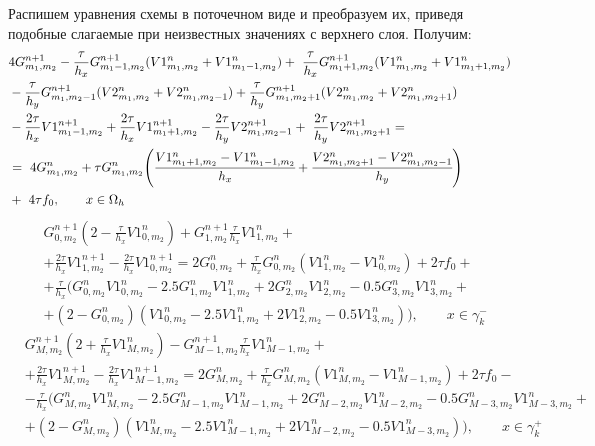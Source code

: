 \documentclass[a4paper,12pt]{extarticle}
\begin{document}
Распишем уравнения схемы в поточечном виде и преобразуем их, приведя подобные слагаемые при неизвестных значениях с верхнего слоя. Получим:
\begin{align*}
	& 4 G_{m_1,m_2}^{n+1}  -\frac{\tau}{h_x}  G_{m_1-1,m_2}^{n+1}(V1_{m_1,m_2}^n + V1_{m_1-1,m_2}^n) +\ \frac{\tau}{h_x} G_{m_1+1,m_2}^{n+1}(V1_{m_1,m_2}^n + V1_{m_1+1,m_2}^n)\\
	& -\frac{\tau}{h_y} G_{m_1,m_2-1}^{n+1}(V2_{m_1,m_2}^n + V2_{m_1,m_2-1}^n)
	+ \frac{\tau}{h_y} G_{m_1,m_2+1}^{n+1}(V2_{m_1,m_2}^n + V2_{m_1,m_2+1}^n)\\
	& -\frac{2\tau}{h_x} V1_{m_1-1,m_2}^{n+1} + \frac{2\tau}{h_x} V1_{m_1+1,m_2}^{n+1}
	-\frac{2\tau}{h_y} V2_{m_1,m_2-1}^{n+1} +\ \frac{2\tau}{h_y} V2_{m_1,m_2+1}^{n+1} = \\
	& =\ 4 G_{m_1,m_2}^n + \tau G_{m_1,m_2}^n 
	\Bigg(\cfrac{V1_{m_1+1,m_2}^n - V1_{m_1-1,m_2}^n}{h_x} +  \cfrac{V2_{m_1,m_2+1}^n - V2_{m_1,m_2-1}^n}{h_y}\Bigg) \\
	& +\ 4\tau f_0, \qquad x\in \Omega _h
\end{align*}
\begin{align*}
	& G_{0,m_2}^{n+1}(2 - \frac{\tau}{h_x}V1_{0,m_2}^n) + G_{1,m_2}^{n+1}\frac{\tau}{h_x}V1_{1,m_2}^n + \\
	& + \frac{2\tau}{h_x}V1_{1,m_2}^{n+1} - \frac{2\tau}{h_x}V1_{0,m_2}^{n+1} = 
	2 G_{0,m_2}^n + \frac{\tau}{h_x} G_{0,m_2}^n (V1_{1,m_2}^n - V1_{0,m_2}^n) + 2\tau f_0 +\\
	& + \frac{\tau}{h_x} \Big( G_{0,m_2}^n V1_{0,m_2}^n - 2.5 G_{1,m_2}^n V1_{1,m_2}^n 
	+ 2 G_{2,m_2}^n V1_{2,m_2}^n - 0.5 G_{3,m_2}^n V1_{3,m_2}^n + \\
	& + (2 - G_{0,m_2}^n)
	(V1_{0,m_2}^n - 2.5 V1_{1,m_2}^n + 2 V1_{2,m_2}^n - 0.5 V1_{3,m_2}^n) \Big), \qquad x \in \gamma_k^-
\end{align*}
\begin{align*}
	& G_{M,m_2}^{n+1}(2 + \frac{\tau}{h_x}V1_{M,m_2}^n) - G_{M-1,m_2}^{n+1}\frac{\tau}{h_x}V1_{M-1,m_2}^n + \\
	& + \frac{2\tau}{h_x}V1_{M,m_2}^{n+1} - \frac{2\tau}{h_x}V1_{M-1,m_2}^{n+1} = 
	2 G_{M,m_2}^n + \frac{\tau}{h_x} G_{M,m_2}^n (V1_{M,m_2}^n - V1_{M-1,m_2}^n) + 2\tau f_0 -\\
	& - \frac{\tau}{h_x} \Big( G_{M,m_2}^n V1_{M,m_2}^n - 2.5 G_{M-1,m_2}^n V1_{M-1,m_2}^n 
	+ 2 G_{M-2,m_2}^n V1_{M-2,m_2}^n - 0.5 G_{M-3,m_2}^n V1_{M-3,m_2}^n + \\
	& + (2 - G_{M,m_2}^n)
	(V1_{M,m_2}^n - 2.5 V1_{M-1,m_2}^n + 2 V1_{M-2,m_2}^n - 0.5 V1_{M-3,m_2}^n) \Big), \qquad x \in \gamma_k^+
\end{align*}
\end{document}
